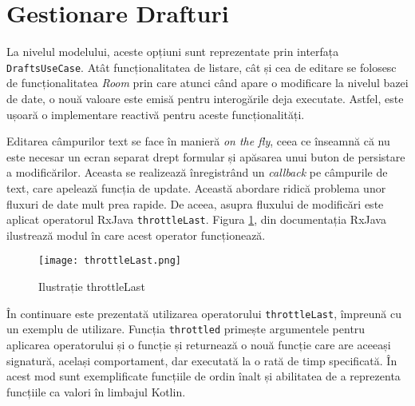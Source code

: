 \section{Gestionare Drafturi}\label{spec:drafts}

La nivelul modelului, aceste opțiuni sunt reprezentate prin interfața \texttt{DraftsUseCase}. Atât funcționalitatea de listare, cât și cea de editare se folosesc de funcționalitatea \emph{Room} prin care atunci când apare o modificare la nivelul bazei de date, o nouă valoare este emisă pentru interogările deja executate. Astfel, este ușoară o implementare reactivă pentru aceste funcționalități.



Editarea câmpurilor text se face în manieră \emph{on the fly}, ceea ce înseamnă că nu este necesar un ecran separat drept formular și apăsarea unui buton de persistare a modificărilor. Aceasta se realizează înregistrând un \emph{callback} pe câmpurile de text, care apelează funcția de update. Această abordare ridică problema unor fluxuri de date mult prea rapide. De aceea, asupra fluxului de modificări este aplicat operatorul RxJava \texttt{throttleLast}. Figura \ref{fig:throttle}, din documentația RxJava \cite{ThrottleLast} ilustrează modul în care acest operator funcționează.

\begin{figure}[h]
  \centering
  \texttt{[image: throttleLast.png]}
  \caption{Ilustrație throttleLast}
  \label{fig:throttle}
\end{figure}

În continuare este prezentată utilizarea operatorului \texttt{throttleLast}, împreună cu un exemplu de utilizare. Funcția \texttt{throttled} primește argumentele pentru aplicarea operatorului și o funcție și returnează o nouă funcție care are aceeași signatură, același comportament, dar executată la o rată de timp specificată. În acest mod sunt exemplificate funcțiile de ordin înalt și abilitatea de a reprezenta funcțiile ca valori în limbajul Kotlin.


